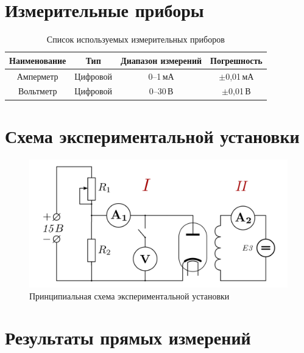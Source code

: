 \documentclass[14pt]{extarticle}
\begin{document}
\section{Измерительные приборы}

\begin{table}[H]
    \centering
    \caption{Список используемых измерительных приборов}
    \begin{tabular}{|c|c|c|c|}
        \hline
        Наименование & Тип & Диапазон измерений & Погрешность \\
        \hline
        Амперметр & Цифровой & 0--1\,мА & $\pm$0,01\,мА \\
        \hline
        Вольтметр & Цифровой & 0--30\,В & $\pm$0,01\,В \\
        \hline
    \end{tabular}
\end{table}

\section{Схема экспериментальной установки}

\begin{figure}[H]
    \centering
    \includegraphics[width=0.7\linewidth]{img/scheme.png}
    \caption{Принципиальная схема экспериментальной установки}
\end{figure}

\section{Результаты прямых измерений}
\end{document}
